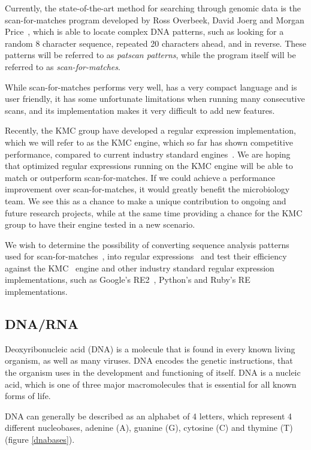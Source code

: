 \documentclass[12pt]{article}
\theoremstyle{definition}
\begin{document}
Currently, the state-of-the-art method for searching through genomic data is the scan-for-matches program developed by Ross Overbeek, David Joerg and Morgan Price~\cite{scan-for-matches}, which is able to locate complex DNA patterns, such as looking for a random 8 character sequence, repeated 20 characters ahead, and in reverse. These patterns will be referred to as \textit{patscan patterns}, while the program itself will be referred to as \textit{scan-for-matches}.

While scan-for-matches performs very well, has a very compact language and is user friendly, it has some unfortunate limitations when running many consecutive scans, and its implementation makes it very difficult to add new features.

Recently, the KMC group have developed a regular expression implementation, which we will refer to as the KMC engine, which so far has shown competitive performance, compared to current industry standard engines~\cite{two-pass-greedy}. We are hoping that optimized regular expressions running on the KMC engine will be able to match or outperform scan-for-matches.
If we could achieve a performance improvement over scan-for-matches, it would greatly benefit the microbiology team. We see this as a chance to make a unique contribution to ongoing and future research projects, while at the same time providing a chance for the KMC group to have their engine tested in a new scenario.

We wish to determine the possibility of converting sequence analysis patterns used for scan-for-matches~\cite{scan-for-matches}, into regular expressions~\cite{crash-course-regex} and test their efficiency against the KMC~\cite{kmc-website} engine and other industry standard regular expression implementations, such as Google's RE2~\cite{re2}, Python's and Ruby's RE implementations.

\subsection{DNA/RNA}

Deoxyribonucleic acid (DNA) is a molecule that is found in every known living organism, as well as many viruses. DNA encodes the genetic instructions, that the organism uses in the development and functioning of itself. DNA is a nucleic acid, which is one of three major macromolecules that is essential for all known forms of life.

DNA can generally be described as an alphabet of 4 letters, which represent 4 different nucleobases, adenine (A), guanine (G), cytosine (C) and thymine (T) (figure \ref{dnabases}).
\end{document}
